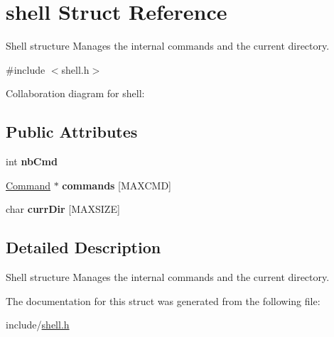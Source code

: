 \hypertarget{structshell}{}\section{shell Struct Reference}
\label{structshell}


Shell structure Manages the internal commands and the current directory.  




{\ttfamily \#include $<$shell.\+h$>$}



Collaboration diagram for shell\+:
\subsection*{Public Attributes}
\begin{DoxyCompactItemize}
\item 
int {\bfseries nb\+Cmd}\hypertarget{structshell_a6af1c77a7c907bb661761db9e2fddac3}{}\label{structshell_a6af1c77a7c907bb661761db9e2fddac3}

\item 
\hyperlink{structcommand}{Command} $\ast$ {\bfseries commands} \mbox{[}M\+A\+X\+C\+MD\mbox{]}\hypertarget{structshell_a384878d149b67196fe47cf0644fd2831}{}\label{structshell_a384878d149b67196fe47cf0644fd2831}

\item 
char {\bfseries curr\+Dir} \mbox{[}M\+A\+X\+S\+I\+ZE\mbox{]}\hypertarget{structshell_accea21735529d21667cddbac2a33457b}{}\label{structshell_accea21735529d21667cddbac2a33457b}

\end{DoxyCompactItemize}


\subsection{Detailed Description}
Shell structure Manages the internal commands and the current directory. 

The documentation for this struct was generated from the following file\+:\begin{DoxyCompactItemize}
\item 
include/\hyperlink{shell_8h}{shell.\+h}\end{DoxyCompactItemize}
